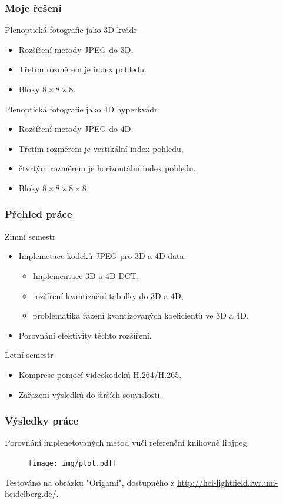 \documentclass[10pt,xcolor=pdflatex]{beamer}
\begin{document}
\begin{frame}\frametitle{Moje řešení}
  \begin{block}{Plenoptická fotografie jako 3D kvádr}
    \begin{itemize}
      \item Rozšíření metody JPEG do 3D.
      \item Třetím rozměrem je index pohledu.
      \item Bloky $8 \times 8 \times 8$.
    \end{itemize}
  \end{block}
  \begin{block}{Plenoptická fotografie jako 4D hyperkvádr}
    \begin{itemize}
      \item Rozšíření metody JPEG do 4D.
      \item Třetím rozměrem je vertikální index pohledu,
      \item čtvrtým rozměrem je horizontální index pohledu.
      \item Bloky $8 \times 8 \times 8 \times 8$.
    \end{itemize}
  \end{block}
\end{frame}

\begin{frame}\frametitle{Přehled práce}
  \begin{block}{Zimní semestr}
    \begin{itemize}
      \item{Implemetace kodeků JPEG pro 3D a 4D data.}
      \begin{itemize}
        \item Implementace 3D a 4D DCT,
        \item rozšíření kvantizační tabulky do 3D a 4D,
        \item problematika řazení kvantizovaných koeficientů ve 3D a 4D.
      \end{itemize}
      \item Porovnání efektivity těchto rozšíření.
    \end{itemize}
  \end{block}
  \begin{block}{Letní semestr}
    \begin{itemize}
      \item Komprese pomocí videokodeků H.264/H.265.
      \item Zařazení výsledků do širších souvislostí.
    \end{itemize}
  \end{block}
\end{frame}

\begin{frame}\frametitle{Výsledky práce}
  Porovnání implenetovaných metod vuči referenční knihovně libjpeg.
  \begin{figure}
    \texttt{[image: img/plot.pdf]}
  \end{figure}
  {
  \centering
  \small
  Testováno na obrázku "Origami", dostupného z \url{http://hci-lightfield.iwr.uni-heidelberg.de/}.
  }
\end{frame}
\end{document}
